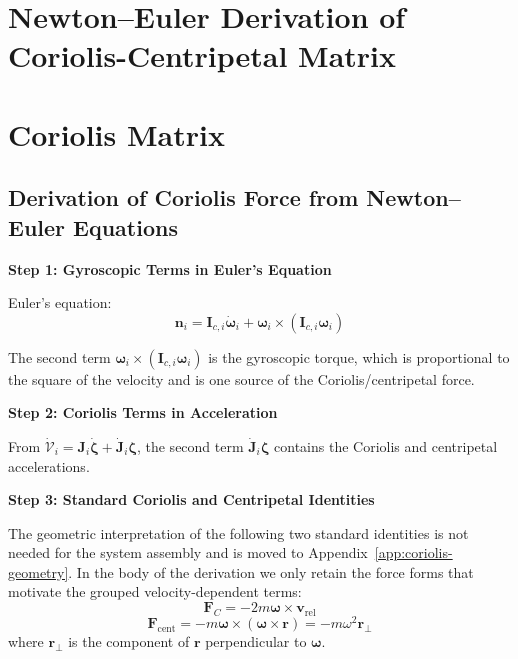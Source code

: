 \documentclass[12pt,a4paper]{report}
\begin{document}
\section{Newton--Euler Derivation of Coriolis-Centripetal Matrix}

\section{Coriolis Matrix}

\subsection{Derivation of Coriolis Force from Newton--Euler Equations}

\textbf{Step 1: Gyroscopic Terms in Euler's Equation}

Euler's equation:
\begin{equation}
\mathbf{n}_i
=
\mathbf{I}_{c,i}\dot{\boldsymbol{\omega}}_i
+
\boldsymbol{\omega}_i \times (\mathbf{I}_{c,i}\boldsymbol{\omega}_i)
\label{eq:old-122}
\end{equation}

The second term $\boldsymbol{\omega}_i \times (\mathbf{I}_{c,i}\boldsymbol{\omega}_i)$ is the gyroscopic torque, which is proportional to the square of the velocity and is one source of the Coriolis/centripetal force.

\textbf{Step 2: Coriolis Terms in Acceleration}

From $\dot{\mathcal{V}}_i = \mathbf{J}_i \dot{\boldsymbol{\zeta}} + \dot{\mathbf{J}}_i \boldsymbol{\zeta}$, the second term $\dot{\mathbf{J}}_i \boldsymbol{\zeta}$ contains the Coriolis and centripetal accelerations.

\textbf{Step 3: Standard Coriolis and Centripetal Identities}

The geometric interpretation of the following two standard identities is not needed for the system assembly and is moved to Appendix~\ref{app:coriolis-geometry}. In the body of the derivation we only retain the force forms that motivate the grouped velocity-dependent terms:
\begin{equation}
\mathbf{F}_C = -2m \boldsymbol{\omega} \times \mathbf{v}_{\text{rel}}
\label{eq:old-123}
\end{equation}
\begin{equation}
\mathbf{F}_{\text{cent}} = -m \boldsymbol{\omega} \times (\boldsymbol{\omega} \times \mathbf{r}) = -m \omega^2 \mathbf{r}_\perp
\label{eq:old-124}
\end{equation}
where $\mathbf{r}_\perp$ is the component of $\mathbf{r}$ perpendicular to $\boldsymbol{\omega}$.
\end{document}

